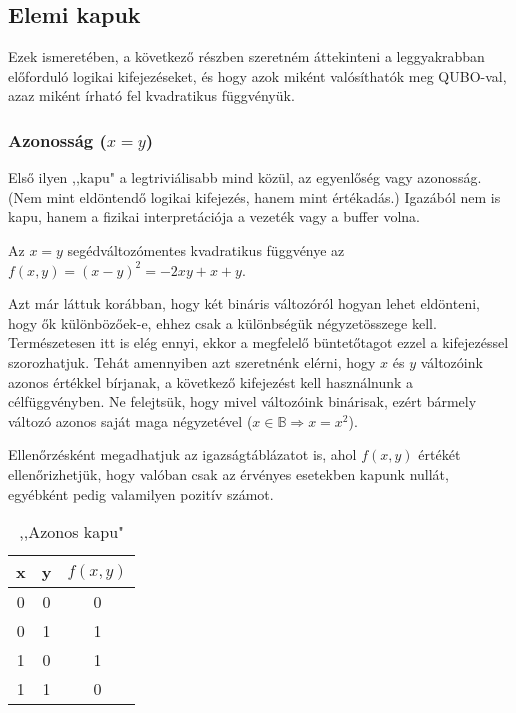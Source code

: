 \subsection{Elemi kapuk}\label{sec:theoryElementaryGates}

Ezek ismeretében, a következő részben szeretném áttekinteni a leggyakrabban előforduló logikai kifejezéseket, és hogy azok miként valósíthatók meg QUBO-val, azaz miként írható fel kvadratikus függvényük.

\subsubsection{Azonosság ($x=y$)}

Első ilyen ,,kapu" a legtriviálisabb mind közül, az egyenlőség vagy azonosság. (Nem mint eldöntendő logikai kifejezés, hanem mint értékadás.) Igazából nem is kapu, hanem a fizikai interpretációja a vezeték vagy a buffer volna. 

\begin{allitas}
	Az $x=y$ segédváltozómentes kvadratikus függvénye az $f(x,y)=(x-y)^2=-2xy+x+y$.
	
	Azt már láttuk korábban, hogy két bináris változóról hogyan lehet eldönteni, hogy ők különbözőek-e, ehhez csak a különbségük négyzetösszege kell. Természetesen itt is elég ennyi, ekkor a megfelelő büntetőtagot ezzel a kifejezéssel szorozhatjuk. Tehát amennyiben azt szeretnénk elérni, hogy $x$ és $y$ változóink azonos értékkel bírjanak, a következő kifejezést kell használnunk a célfüggvényben. Ne felejtsük, hogy mivel változóink binárisak, ezért bármely változó azonos saját maga négyzetével ($x \in \mathbb{B} \Rightarrow x = x^2$).	
\end{allitas}
	
	Ellenőrzésként megadhatjuk az igazságtáblázatot is, ahol $f(x,y)$ értékét ellenőrizhetjük, hogy valóban csak az érvényes esetekben kapunk nullát, egyébként pedig valamilyen pozitív számot.
	\begin{table}[ht]
		\footnotesize
		\centering
		\begin{tabular}{ c c c }
			\toprule
			x & y & $f(x,y)$ \\
			\midrule
			0 & 0 & 0 \\
			0 & 1 & 1 \\
			1 & 0 & 1 \\
			1 & 1 & 0 \\		
			\bottomrule
		\end{tabular}
		\caption{,,Azonos kapu"}
		\label{tab:SAMEgate}
	\end{table}	



